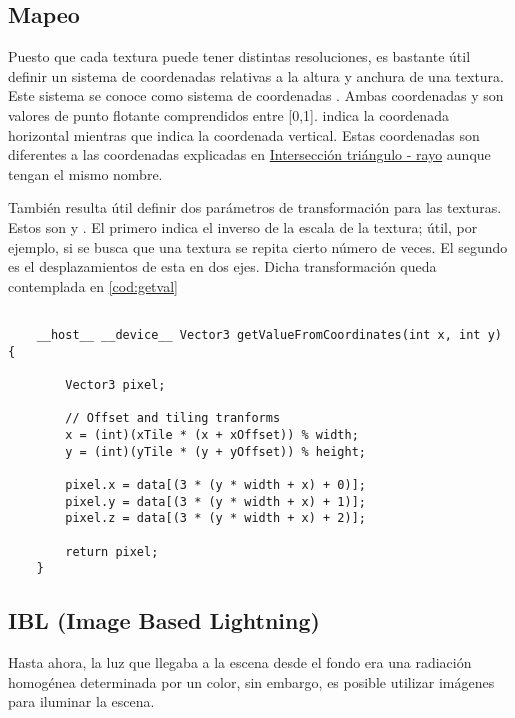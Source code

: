 	
\subsection{Mapeo}

Puesto que cada textura puede tener distintas resoluciones, es bastante útil definir un sistema de coordenadas relativas a la altura y anchura de una textura. Este sistema se conoce como sistema de coordenadas . Ambas coordenadas  y  son valores de punto flotante comprendidos entre [0,1].  indica la coordenada horizontal mientras que  indica la coordenada vertical. Estas coordenadas son diferentes a las coordenadas  explicadas en \hyperref[subsec:triintersection]{Intersección triángulo - rayo} aunque tengan el mismo nombre.

También resulta útil definir dos parámetros de transformación para las texturas. Estos son  y . El primero indica el inverso de la escala de la textura; útil, por ejemplo, si se busca que una textura se repita cierto número de veces. El segundo es el desplazamientos de esta en dos ejes. Dicha transformación queda contemplada en \autoref{cod:getval}

\begin{minipage}[c]{0.95\textwidth}
\begin{lstlisting}[label={cod:getval}, caption={Código para obtener valor de una textura.}]
	
	__host__ __device__ Vector3 getValueFromCoordinates(int x, int y) {
	
        Vector3 pixel;

        // Offset and tiling tranforms
        x = (int)(xTile * (x + xOffset)) % width;
        y = (int)(yTile * (y + yOffset)) % height;

        pixel.x = data[(3 * (y * width + x) + 0)];
        pixel.y = data[(3 * (y * width + x) + 1)];
        pixel.z = data[(3 * (y * width + x) + 2)];

        return pixel;
    }
\end{lstlisting}
\end{minipage}

\subsection{IBL (Image Based Lightning)}
	
Hasta ahora, la luz que llegaba a la escena desde el fondo era una radiación homogénea determinada por un color, sin embargo, es posible utilizar imágenes para iluminar la escena.
	
